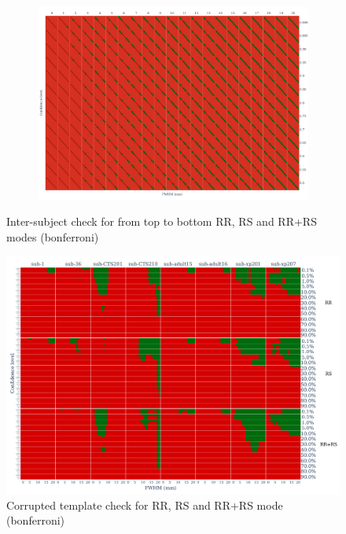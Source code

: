 \documentclass{article}
\begin{document}
\begin{figure}
    \begin{subfigure}[t]{0.7\linewidth}
        \includegraphics[width=\linewidth]{figures/inter-subject/one_mct_fwe_bonferroni_RR-RS.pdf}
    \end{subfigure}
    \label{fig:ieee-check}
    \caption{Inter-subject check for from top to bottom RR, RS and RR+RS modes (bonferroni)}
\end{figure}

\begin{figure}
    \centering
    \includegraphics[width=\linewidth]{figures/template/one_mct_fwe_bonferroni__template_annotated.pdf}
    \caption{Corrupted template check for RR, RS and RR+RS mode (bonferroni)}
\end{figure}
\end{document}
